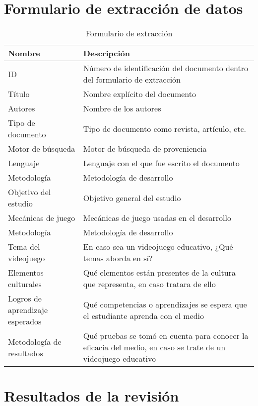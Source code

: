 \section{Formulario de extracción de datos}

\begin{table}[H]
    \centering
    \begin{tabularx}{\textwidth}{|X|X|}
        \hline
        Nombre & Descripción \\ \hline
        ID & Número de identificación del documento dentro del formulario de extracción \\ \hline
        Título & Nombre explícito del documento \\ \hline
        Autores & Nombre de los autores \\ \hline
        Tipo de documento & Tipo de documento como revista, artículo, etc. \\ \hline
        Motor de búsqueda & Motor de búsqueda de proveniencia \\ \hline
        Lenguaje & Lenguaje con el que fue escrito el documento \\ \hline
        Metodología & Metodología de desarrollo \\ \hline
        Objetivo del estudio & Objetivo general del estudio \\ \hline
        Mecánicas de juego & Mecánicas de juego usadas en el desarrollo \\ \hline
        Metodología & Metodología de desarrollo \\ \hline
        Tema del videojuego & En caso sea un videojuego educativo, ¿Qué temas aborda en sí? \\ \hline
        Elementos culturales & Qué elementos están presentes de la cultura que representa, en caso tratara de ello \\ \hline
        Logros de aprendizaje esperados & Qué competencias o aprendizajes se espera que el estudiante aprenda con el medio \\ \hline
        Metodología de resultados & Qué pruebas se tomó en cuenta para conocer la eficacia del medio, en caso se trate de un videojuego educativo \\ \hline
        
    \end{tabularx}
    \caption{Formulario de extracción}
    \label{tab:placeholder}
\end{table}

\section{Resultados de la revisión}


